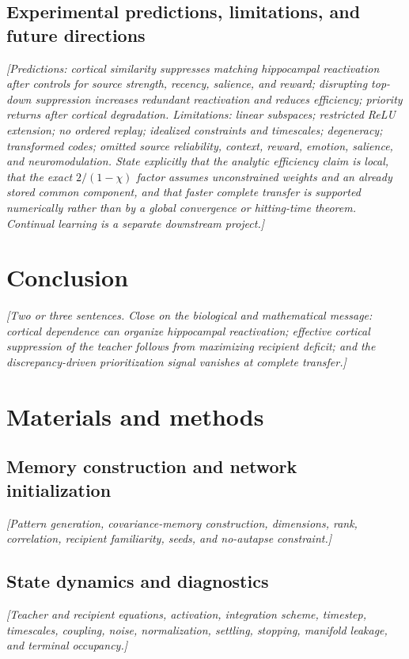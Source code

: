 \documentclass[10pt,letterpaper]{article}
\theoremstyle{plain}
\theoremstyle{remark}
\begin{document}
\subsection{Experimental predictions, limitations, and future directions}
\textit{[Predictions: cortical similarity suppresses matching hippocampal reactivation after controls for source strength, recency, salience, and reward; disrupting top-down suppression increases redundant reactivation and reduces efficiency; priority returns after cortical degradation. Limitations: linear subspaces; restricted ReLU extension; no ordered replay; idealized constraints and timescales; degeneracy; transformed codes; omitted source reliability, context, reward, emotion, salience, and neuromodulation. State explicitly that the analytic efficiency claim is local, that the exact $2/(1-\chi)$ factor assumes unconstrained weights and an already stored common component, and that faster complete transfer is supported numerically rather than by a global convergence or hitting-time theorem. Continual learning is a separate downstream project.]}

\section{Conclusion}
\textit{[Two or three sentences. Close on the biological and mathematical message: cortical dependence can organize hippocampal reactivation; effective cortical suppression of the teacher follows from maximizing recipient deficit; and the discrepancy-driven prioritization signal vanishes at complete transfer.]}

\section{Materials and methods}

\subsection{Memory construction and network initialization}
\textit{[Pattern generation, covariance-memory construction, dimensions, rank, correlation, recipient familiarity, seeds, and no-autapse constraint.]}

\subsection{State dynamics and diagnostics}
\textit{[Teacher and recipient equations, activation, integration scheme, timestep, timescales, coupling, noise, normalization, settling, stopping, manifold leakage, and terminal occupancy.]}
\end{document}
